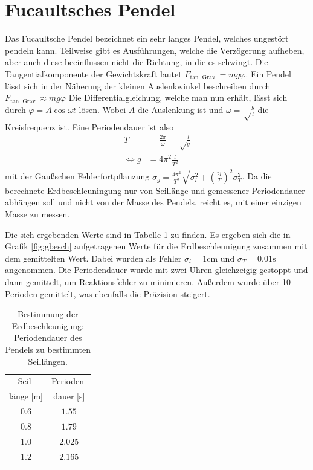 \documentclass[12pt,a4paper,titlepage,headinclude,bibtotoc]{scrartcl}
\begin{document}
\section{Fucaultsches Pendel}

Das Fucaultsche Pendel bezeichnet ein sehr langes Pendel, welches ungestört pendeln kann.
Teilweise gibt es Ausführungen, welche die Verzögerung aufheben, aber auch diese beeinflussen nicht die Richtung, in die es schwingt.
Die Tangentialkomponente der Gewichtskraft lautet $F_\text{tan. Grav.}=mg\ddot\varphi$.
Ein Pendel lässt sich in der Näherung der kleinen Auslenkwinkel beschreiben durch $F_\text{tan. Grav.}\approx mg\varphi$
Die Differentialgleichung, welche man nun erhält, lässt sich durch $\varphi=A\cos\omega t$ lösen.
Wobei $A$ die Auslenkung ist und $\omega=\sqrt\frac{g}{l}$ die Kreisfrequenz ist.
Eine Periodendauer ist also
\begin{align}
	T&=\frac{2\pi}{\omega}=\sqrt\frac{l}{g}\label{eq:pendelPeriode}\\
	\Leftrightarrow g&=4\pi^2\frac{l}{T^2}
\end{align}
mit der Gaußschen Fehlerfortpflanzung $\sigma_g=\frac{4\pi^2}{T^2}\sqrt{\sigma_l^2+\left(\frac{2l}{T} \right)^2\sigma_T^2}$.
Da die berechnete Erdbeschleuningung nur von Seillänge und gemessener Periodendauer abhängen soll und nicht von der Masse des Pendels, reicht es, mit einer einzigen Masse zu messen.

Die sich ergebenden Werte sind in Tabelle \ref{tab:gbesch} zu finden.
Es ergeben sich die in Grafik \ref{fig:gbesch} aufgetragenen Werte für die Erdbeschleunigung zusammen mit dem gemittelten Wert.
Dabei wurden als Fehler $\sigma_l=1\si{\centi\meter}$ und $\sigma_T=0.01\si\second$ angenommen.
Die Periodendauer wurde mit zwei Uhren gleichzeigig gestoppt und dann gemittelt, um Reaktionsfehler zu minimieren.
Außerdem wurde über 10 Perioden gemittelt, was ebenfalls die Präzision steigert.


\begin{table}[!htb]
	\centering
	\begin{tabular}{|c|c|}
		\hline
		Seil- & Perioden- \\
		länge [m] & dauer [s] \\
		\hline
		$0.6$ & $1.55$\\
		$0.8$ & $1.79$\\
		$1.0$ & $2.025$\\
		$1.2$ & $2.165$\\
		\hline
	\end{tabular}
	\caption{Bestimmung der Erdbeschleunigung: Periodendauer des Pendels zu bestimmten Seillängen.}
	\label{tab:gbesch}
\end{table}
\end{document}
